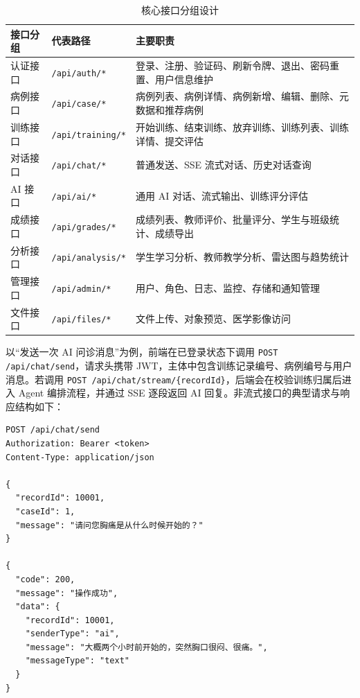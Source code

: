 \begin{table}[H]
    \centering
    \caption{核心接口分组设计}
    \label{tab:api_groups}
    \begin{tabular}{l l p{7cm}}
        \toprule
        接口分组 & 代表路径 & 主要职责 \\
        \midrule
        认证接口 & \texttt{/api/auth/*} & 登录、注册、验证码、刷新令牌、退出、密码重置、用户信息维护 \\
        病例接口 & \texttt{/api/case/*} & 病例列表、病例详情、病例新增、编辑、删除、元数据和推荐病例 \\
        训练接口 & \texttt{/api/training/*} & 开始训练、结束训练、放弃训练、训练列表、训练详情、提交评估 \\
        对话接口 & \texttt{/api/chat/*} & 普通发送、SSE 流式对话、历史对话查询 \\
        AI 接口 & \texttt{/api/ai/*} & 通用 AI 对话、流式输出、训练评分评估 \\
        成绩接口 & \texttt{/api/grades/*} & 成绩列表、教师评价、批量评分、学生与班级统计、成绩导出 \\
        分析接口 & \texttt{/api/analysis/*} & 学生学习分析、教师教学分析、雷达图与趋势统计 \\
        管理接口 & \texttt{/api/admin/*} & 用户、角色、日志、监控、存储和通知管理 \\
        文件接口 & \texttt{/api/files/*} & 文件上传、对象预览、医学影像访问 \\
        \bottomrule
    \end{tabular}
\end{table}

以“发送一次 AI 问诊消息”为例，前端在已登录状态下调用 \texttt{POST /api/chat/send}，请求头携带 JWT，主体中包含训练记录编号、病例编号与用户消息。若调用 \texttt{POST /api/chat/stream/\{recordId\}}，后端会在校验训练归属后进入 Agent 编排流程，并通过 SSE 逐段返回 AI 回复。非流式接口的典型请求与响应结构如下：

\begin{lstlisting}[caption={AI 问诊消息接口请求与响应示例}, label={lst:chat_api}]
POST /api/chat/send
Authorization: Bearer <token>
Content-Type: application/json

{
  "recordId": 10001,
  "caseId": 1,
  "message": "请问您胸痛是从什么时候开始的？"
}

{
  "code": 200,
  "message": "操作成功",
  "data": {
    "recordId": 10001,
    "senderType": "ai",
    "message": "大概两个小时前开始的，突然胸口很闷、很痛。",
    "messageType": "text"
  }
}
\end{lstlisting}

